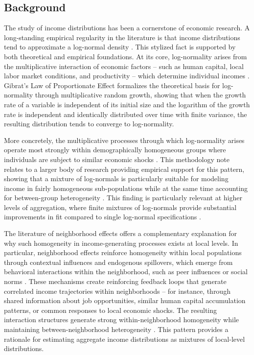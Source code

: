 
\subsection{Background}

The study of income distributions has been a cornerstone of economic research. A long-standing empirical regularity in the literature is that income distributions tend to approximate a log-normal density \citep{aitchison1957lognormal}. This stylized fact is supported by both theoretical and empirical foundations. At its core, log-normality arises from the multiplicative interaction of economic factors -- such as human capital, local labor market conditions, and productivity -- which determine individual incomes \citep{neal2000theories}. Gibrat's Law of Proportionate Effect \citep{gibrat1931inegalites} formalizes the theoretical basis for log-normality through multiplicative random growth, showing that when the growth rate of a variable is independent of its initial size and the logarithm of the growth rate is independent and identically distributed over time with finite variance, the resulting distribution tends to converge to log-normality. 

More concretely, the multiplicative processes through which log-normality arises operate most strongly within demographically homogeneous groups where individuals are subject to similar economic shocks \citep{weiss1972, aitchison1957lognormal, battistin2009consumption}. This methodology note relates to a larger body of research providing empirical support for this pattern, showing that a mixture of log-normals is particularly suitable for modeling income in fairly homogeneous sub-populations while at the same time accounting for between-group heterogeneity \citep{flachaire2007, lubrano2016}. This finding is particularly relevant at higher levels of aggregation, where finite mixtures of log-normals provide substantial improvements in fit compared to single log-normal specifications \citep{gardini2022}.

The literature of neighborhood effects offers a complementary explanation for why such homogeneity in income-generating processes exists at local levels. In particular, neighborhood effects reinforce homogeneity within local populations through contextual influences and endogenous spillovers, which emerge from behavioral interactions within the neighborhood, such as peer influences or social norms \citep{manski1993identification, durlauf1996neighborhoods}. These mechanisms create reinforcing feedback loops that generate correlated income trajectories within neighborhoods -- for instance, through shared information about job opportunities, similar human capital accumulation patterns, or common responses to local economic shocks.  The resulting interaction structures generate strong within-neighborhood homogeneity while maintaining between-neighborhood heterogeneity \citep{durlauf2004neighborhood}. This pattern provides a rationale for estimating aggregate income distributions as mixtures of local-level distributions.


